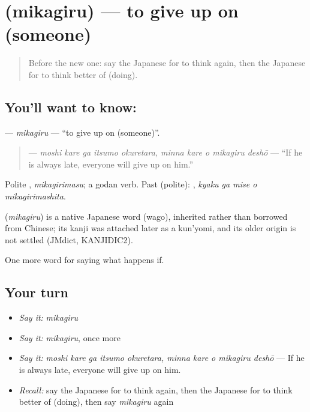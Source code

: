 \section[\texorpdfstring{\ja{みかぎる} (mikagiru)}{みかぎる (mikagiru)}]{ (mikagiru) — to give up on (someone)}

\label{lesson:JA-C519-mikagiru}



\begin{quote}
Before the new one: say the Japanese for to think again, then the Japanese for to think better of (doing).
\end{quote}

\subsection*{You'll want to know: }
\textbf{} — \emph{mikagiru} — \textquotedblleft{}to give up on (someone)\textquotedblright{}.

\begin{quote}
\textbf{     } — \emph{moshi kare ga itsumo okuretara, minna kare o mikagiru deshō} — \textquotedblleft{}If he is always late, everyone will give up on him.\textquotedblright{}
\end{quote}

Polite \textbf{}, \emph{mikagirimasu}; a godan verb. Past (polite): \textbf{  }, \emph{kyaku ga mise o mikagirimashita}.

\begin{cousinweb}
\textbf{} (\emph{mikagiru}) is a native Japanese word (wago), inherited rather than borrowed from Chinese; its kanji was attached later as a kun'yomi, and its older origin is not settled (JMdict, KANJIDIC2).
\end{cousinweb}

\begin{grammarlens}[title={What you've built}]
One more word for saying what happens if.
\end{grammarlens}

\subsection*{Your turn}
\begin{itemize}
\raggedright
  \item \emph{Say it:} \emph{mikagiru}
  \item \emph{Say it:} \emph{mikagiru}, once more
  \item \emph{Say it:} \emph{moshi kare ga itsumo okuretara, minna kare o mikagiru deshō} — If he is always late, everyone will give up on him.
  \item \emph{Recall:} say the Japanese for to think again, then the Japanese for to think better of (doing), then say \emph{mikagiru} again
\end{itemize}

